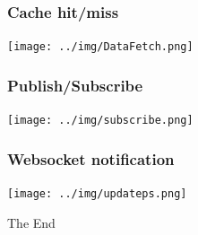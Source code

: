 \documentclass{beamer}
\begin{document}
\begin{frame}
\frametitle{Cache hit/miss}
\centerline{\texttt{[image: ../img/DataFetch.png]}}
\end{frame}



\begin{frame}
\frametitle{Publish/Subscribe}
\centerline{\texttt{[image: ../img/subscribe.png]}}
\end{frame}

\begin{frame}
\frametitle{Websocket notification}
\centerline{\texttt{[image: ../img/updateps.png]}}
\end{frame}





\begin{frame}
\Huge{\centerline{The End}}
\end{frame}

\end{document}
